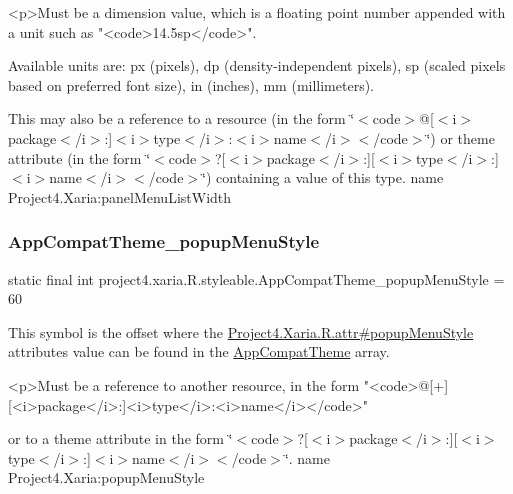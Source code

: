 \begin{DoxyVerb}      <p>Must be a dimension value, which is a floating point number appended with a unit such as "<code>14.5sp</code>".
\end{DoxyVerb}
 Available units are\+: px (pixels), dp (density-\/independent pixels), sp (scaled pixels based on preferred font size), in (inches), mm (millimeters). 

This may also be a reference to a resource (in the form \char`\"{}$<$code$>$@\mbox{[}$<$i$>$package$<$/i$>$\+:\mbox{]}$<$i$>$type$<$/i$>$\+:$<$i$>$name$<$/i$>$$<$/code$>$\char`\"{}) or theme attribute (in the form \char`\"{}$<$code$>$?\mbox{[}$<$i$>$package$<$/i$>$\+:\mbox{]}\mbox{[}$<$i$>$type$<$/i$>$\+:\mbox{]}$<$i$>$name$<$/i$>$$<$/code$>$\char`\"{}) containing a value of this type.  name Project4.\+Xaria\+:panel\+Menu\+List\+Width \mbox{\label{classproject4_1_1xaria_1_1R_1_1styleable_abd4023d3d2a91ab681c1225563f99a45}} 
\subsubsection{\texorpdfstring{App\+Compat\+Theme\+\_\+popup\+Menu\+Style}{AppCompatTheme\_popupMenuStyle}}
{\footnotesize\ttfamily static final int project4.\+xaria.\+R.\+styleable.\+App\+Compat\+Theme\+\_\+popup\+Menu\+Style = 60\hspace{0.3cm}{\ttfamily [static]}}

This symbol is the offset where the \hyperlink{}{Project4.\+Xaria.\+R.\+attr\#popup\+Menu\+Style} attribute\textquotesingle{}s value can be found in the \hyperlink{classproject4_1_1xaria_1_1R_1_1styleable_aad8bec413e2350f9404e6ff0e831a85d}{App\+Compat\+Theme} array.

\begin{DoxyVerb}      <p>Must be a reference to another resource, in the form "<code>@[+][<i>package</i>:]<i>type</i>:<i>name</i></code>"
\end{DoxyVerb}
 or to a theme attribute in the form \char`\"{}$<$code$>$?\mbox{[}$<$i$>$package$<$/i$>$\+:\mbox{]}\mbox{[}$<$i$>$type$<$/i$>$\+:\mbox{]}$<$i$>$name$<$/i$>$$<$/code$>$\char`\"{}.  name Project4.\+Xaria\+:popup\+Menu\+Style \mbox{\label{classproject4_1_1xaria_1_1R_1_1styleable_af65cde560faf376a1a1d60f7eb858a6d}} 
